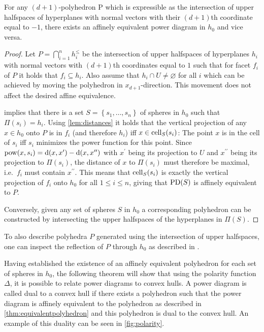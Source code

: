 \begin{theorem}
    \label{thm:equivalentpolyhedron}
    For any $(d+1)$-polyhedron P which is expressible as the intersection of upper halfspaces of hyperplanes with normal vectors with their $(d+1)$th coordinate equal to $-1$, there exists an affinely equivalent power diagram in $h_0$ and vice versa.
\end{theorem}
\begin{proof}
    Let $P = \bigcap_{i=1}^n h_i^\leq$ be the intersection of upper halfspaces of hyperplanes $h_i$ with normal vectors with $(d+1)$th coordinates equal to $1$ such that for facet $f_i$ of $P$ it holds that $f_i \subseteq h_i$.
    Also assume that $h_i \cap U \neq \varnothing$ for all $i$ which can be achieved by moving the polyhedron in $x_{d+1}$-direction.
    This movement does not affect the desired affine equivalence.

     implies that there is a set $S = \left\{ s_1, \dots, s_n \right\}$ of spheres in $h_0$ such that $\Pi(s_i) = h_i$.
    Using \cref{lem:distances} it holds that the vertical projection of any $x \in h_0$ onto $P$ is in $f_i$ (and therefore $h_i$) iff $x \in \operatorname{cell}_S(s_i)$:
    The point $x$ is in the cell of $s_i$ iff $s_i$ minimizes the power function for this point.
    Since $\operatorname{pow}(x, s_i) = \operatorname{d}(x, x^\prime) - \operatorname{d}(x, x^{\prime\prime})$ with $x^\prime$ being its projection to $U$ and $x^{\prime\prime}$ being its projection to $\Pi(s_i)$, the distance of $x$ to $\Pi(s_i)$ must therefore be maximal, i.e.~$f_i$ must contain $x^{\prime\prime}$.
    This means that $\operatorname{cell}_S(s_i)$ is exactly the vertical projection of $f_i$ onto $h_0$ for all $1 \leq i \leq n$, giving that $\operatorname{PD}(S)$ is affinely equivalent to $P$.

    Conversely, given any set of spheres $S$ in $h_0$ a corresponding polyhedron can be constructed by intersecting the upper halfspaces of the hyperplanes in $\Pi(S)$.
\end{proof}
To also describe polyhedra $P$ generated using the intersection of upper halfspaces, one can inspect the reflection of $P$ through $h_0$ as described in \cite{aurenhammer1987power}.

Having established the existence of an affinely equivalent polyhedron for each set of spheres in $h_0$, the following theorem will show that using the polarity function $\Delta$, it is possible to relate power diagrams to convex hulls.
A power diagram is called dual to a convex hull if there exists a polyhedron such that the power diagram is affinely equivalent to the polyhedron as described in \cref{thm:equivalentpolyhedron} and this polyhedron is dual to the convex hull.
An example of this duality can be seen in \cref{fig:polarity}.

